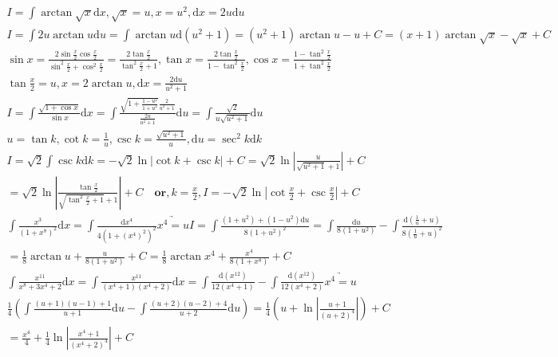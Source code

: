 \documentclass{article}
\begin{document}
\clearpage
\begin{align*} 
    I = \int \arctan \sqrt{x} \mathrm{d}x , \sqrt{x} = u ,x = u^2 , \mathrm{d}x = 2u\mathrm{d}u \\
    I = \int 2u\arctan u \mathrm{d}u = \int \arctan u \mathrm{d}(u^2+1) = (u^2+1)\arctan u - u + C = (x+1)\arctan\sqrt{x} - \sqrt{x} + C\\
    \sin x = \frac{2\sin \frac{x}{2}\cos \frac{x}{2}}{\sin^2 \frac{x}{2} + \cos^2 \frac{x}{2}} = \frac{2\tan \frac{x}{2}}{\tan^2 \frac{x}{2} + 1} ,\tan x = \frac{2\tan \frac{x}{2}}{1 - \tan^2 \frac{x}{2}} , \cos x = \frac{1-\tan^2 \frac{x}{2}}{1+ \tan^2 \frac{x}{2}} \\
    \tan \frac{x}{2} = u , x = 2\arctan u ,\mathrm{d}x = \frac{2\mathrm{d}u}{u^2+1}\\
    I = \int \frac{\sqrt{1+\cos x}}{\sin x}\mathrm{d}x = \int \frac{\sqrt{1+\frac{1-u^2}{1+u^2}}\frac{2}{u^2+1}}{\frac{2u}{u^2+1}}\mathrm{d}u = \int \frac{\sqrt{2}}{u\sqrt{u^2+1}}\mathrm{d}u \\
    u = \tan k ,\cot k = \frac{1}{u} , \csc k = \frac{\sqrt{u^2+1}}{u} , \mathrm{d} u = \sec^2 k \mathrm{d} k \\
    I = \sqrt{2} \int \csc k \mathrm{d} k = -\sqrt{2}\ln|\cot k + \csc k| + C = \sqrt{2}\ln\left|\frac{u}{\sqrt{u^2+1}+1}\right| + C \\
    = \sqrt{2} \ln \left| \frac{\tan \frac{x}{2}}{\sqrt{\tan^2 \frac{x}{2}+1} + 1}\right| + C \quad \mathbf{or} ,k =\frac{x}{2} , I = -\sqrt{2}\ln\left|\cot \frac{x}{2} + \csc \frac{x}{2}\right| + C \\
    \int \frac{x^3}{(1+x^8)^2}\mathrm{d}x = \int \frac{\mathrm{d}x^4}{4(1+(x^4)^2)^2} \underrightarrow{x^4 = u} I = \int \frac{(1+u^2)+(1-u^2)\mathrm{d}u}{8(1+u^2)^2} = \int \frac{\mathrm{d}u}{8(1+u^2)} - \int \frac{\mathrm{d}(\frac{1}{u}+u)}{8(\frac{1}{u}+u)^2} \\
    = \frac{1}{8}\arctan u + \frac{u}{8(1+u^2)} + C = \frac{1}{8}\arctan x^4 + \frac{x^4}{8(1+x^8)} + C \\
    \int \frac{x^{11}}{x^8+3x^4+2} \mathrm{d}x = \int \frac{x^{11}}{(x^4+1)(x^4+2)}\mathrm{d}x = \int \frac{\mathrm{d}(x^{12})}{12(x^4+1)} - \int \frac{\mathrm{d}(x^{12})}{12(x^4+2)} \underrightarrow{x^4 = u} \\ 
    \frac{1}{4}\left(\int \frac{(u+1)(u-1)+1 }{u+1}\mathrm{d}u - \int \frac{(u+2)(u-2)+4}{u+2}\mathrm{d}u\right) = \frac{1}{4}\left( u + \ln\left| \frac{u+1}{(u+2)^4}\right|\right) + C \\ 
    = \frac{x^4}{4} + \frac{1}{4}\ln\left|\frac{x^4+1}{(x^4+2)^4}\right| + C \\

\end{align*}
\end{document}
